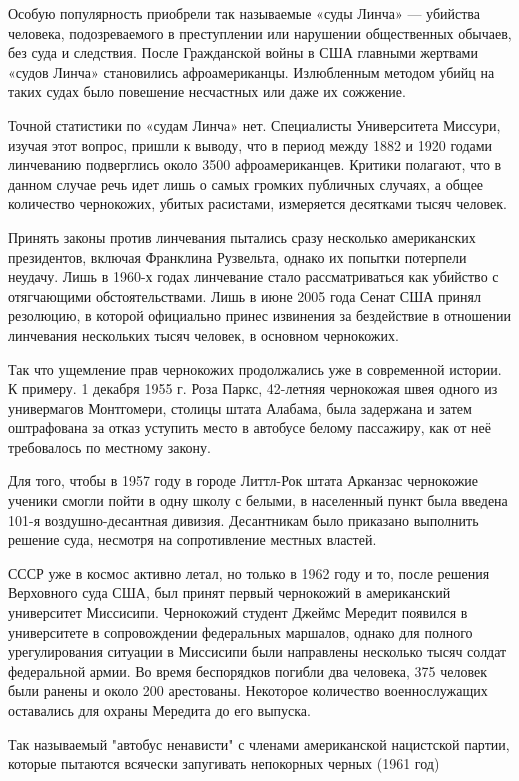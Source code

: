 \documentclass[a4paper,11pt]{extreport}
\begin{document}
Особую популярность приобрели так называемые «суды Линча» --- убийства человека,
подозреваемого в преступлении или нарушении общественных обычаев, без суда и
следствия. После Гражданской войны в США главными жертвами «судов Линча»
становились афроамериканцы. Излюбленным методом убийц на таких судах было
повешение несчастных или даже их сожжение.

Точной статистики по «судам Линча» нет. Специалисты Университета Миссури,
изучая этот вопрос, пришли к выводу, что в период между 1882 и 1920 годами
линчеванию подверглись около 3500 афроамериканцев. Критики полагают, что в
данном случае речь идет лишь о самых громких публичных случаях, а общее
количество чернокожих, убитых расистами, измеряется десятками тысяч человек.

Принять законы против линчевания пытались сразу несколько американских
президентов, включая Франклина Рузвельта, однако их попытки потерпели неудачу.
Лишь в 1960-х годах линчевание стало рассматриваться как убийство с отягчающими
обстоятельствами. Лишь в июне 2005 года Сенат США принял резолюцию, в которой
официально принес извинения за бездействие в отношении линчевания нескольких
тысяч человек, в основном чернокожих.

Так что ущемление прав чернокожих продолжались уже в современной истории. К
примеру. 1 декабря 1955 г. Роза Паркс, 42-летняя чернокожая швея одного из
универмагов Монтгомери, столицы штата Алабама, была задержана и затем
оштрафована за отказ уступить место в автобусе белому пассажиру, как от неё
требовалось по местному закону.

Для того, чтобы в 1957 году в городе Литтл-Рок штата Арканзас чернокожие
ученики смогли пойти в одну школу с белыми, в населенный пункт была введена
101-я воздушно-десантная дивизия. Десантникам было приказано выполнить решение
суда, несмотря на сопротивление местных властей.

СССР уже в космос активно летал, но только в 1962 году и то, после решения
Верховного суда США, был принят первый чернокожий в американский университет
Миссисипи. Чернокожий студент Джеймс Мередит появился в университете в
сопровождении федеральных маршалов, однако для полного урегулирования ситуации
в Миссисипи были направлены несколько тысяч солдат федеральной армии. Во время
беспорядков погибли два человека, 375 человек были ранены и около 200
арестованы. Некоторое количество военнослужащих оставались для охраны Мередита
до его выпуска.

Так называемый "автобус ненависти" с членами американской нацистской партии,
которые пытаются всячески запугивать непокорных черных (1961 год)
\end{document}
